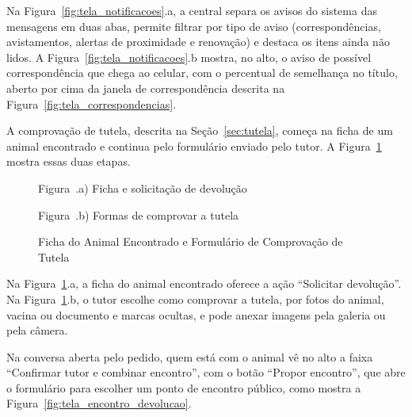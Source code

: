Na Figura~\ref{fig:tela_notificacoes}.a, a central separa os avisos do sistema das mensagens em duas abas, permite filtrar por tipo de aviso (correspondências, avistamentos, alertas de proximidade e renovação) e destaca os itens ainda não lidos. A Figura~\ref{fig:tela_notificacoes}.b mostra, no alto, o aviso de possível correspondência que chega ao celular, com o percentual de semelhança no título, aberto por cima da janela de correspondência descrita na Figura~\ref{fig:tela_correspondencias}.

A comprovação de tutela, descrita na Seção~\ref{sec:tutela}, começa na ficha de um animal encontrado e continua pelo formulário enviado pelo tutor. A Figura~\ref{fig:tela_comprovacao_tutela} mostra essas duas etapas.

\begin{figure}[H]
    \centering
    \caption{Ficha do Animal Encontrado e Formulário de Comprovação de Tutela}
    \label{fig:tela_comprovacao_tutela}
    \vspace{0.15cm}
    \begin{minipage}[t]{0.46\textwidth}
        \centering
        \par\vspace{0.12cm}
        {\small Figura~\thefigure.a) Ficha e solicitação de devolução}
    \end{minipage}
    \hspace{0.06\textwidth}
    \begin{minipage}[t]{0.46\textwidth}
        \centering
        \par\vspace{0.12cm}
        {\small Figura~\thefigure.b) Formas de comprovar a tutela}
    \end{minipage}
    \par\vspace{0.12cm}
\end{figure}

Na Figura~\ref{fig:tela_comprovacao_tutela}.a, a ficha do animal encontrado oferece a ação ``Solicitar devolução''. Na Figura~\ref{fig:tela_comprovacao_tutela}.b, o tutor escolhe como comprovar a tutela, por fotos do animal, vacina ou documento e marcas ocultas, e pode anexar imagens pela galeria ou pela câmera.

Na conversa aberta pelo pedido, quem está com o animal vê no alto a faixa ``Confirmar tutor e combinar encontro'', com o botão ``Propor encontro'', que abre o formulário para escolher um ponto de encontro público, como mostra a Figura~\ref{fig:tela_encontro_devolucao}.

